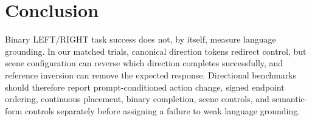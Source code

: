 \section{Conclusion}
\label{sec:conclusion}

Binary LEFT/RIGHT task success does not, by itself, measure language grounding. In our matched trials, canonical direction tokens redirect control, but scene configuration can reverse which direction completes successfully, and reference inversion can remove the expected response. Directional benchmarks should therefore report prompt-conditioned action change, signed endpoint ordering, continuous placement, binary completion, scene controls, and semantic-form controls separately before assigning a failure to weak language grounding.
